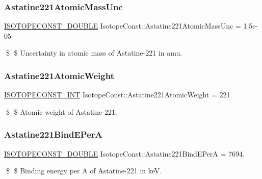 \subsubsection{\texorpdfstring{Astatine221\+Atomic\+Mass\+Unc}{Astatine221AtomicMassUnc}}
{\footnotesize\ttfamily \mbox{\hyperlink{group___isotope_const-_macros_ga8f45a7272ce02c0b4c65c44636ed719a}{I\+S\+O\+T\+O\+P\+E\+C\+O\+N\+S\+T\+\_\+\+D\+O\+U\+B\+LE}} Isotope\+Const\+::\+Astatine221\+Atomic\+Mass\+Unc = 1.\+5e-\/05}

\$ \$ Uncertainty in atomic mass of Astatine-\/221 in amu. \mbox{\label{group___isotope_const-_astatine-_at221_ga7865469d9987007f6b9b3aa79bedcbfa}} 
\subsubsection{\texorpdfstring{Astatine221\+Atomic\+Weight}{Astatine221AtomicWeight}}
{\footnotesize\ttfamily \mbox{\hyperlink{group___isotope_const-_macros_ga5f18360b3e99483a35c32d789e62621c}{I\+S\+O\+T\+O\+P\+E\+C\+O\+N\+S\+T\+\_\+\+I\+NT}} Isotope\+Const\+::\+Astatine221\+Atomic\+Weight = 221}

\$ \$ Atomic weight of Astatine-\/221. \mbox{\label{group___isotope_const-_astatine-_at221_ga42c8932a5d744331c6c93c31ceb1fb90}} 
\subsubsection{\texorpdfstring{Astatine221\+Bind\+E\+PerA}{Astatine221BindEPerA}}
{\footnotesize\ttfamily \mbox{\hyperlink{group___isotope_const-_macros_ga8f45a7272ce02c0b4c65c44636ed719a}{I\+S\+O\+T\+O\+P\+E\+C\+O\+N\+S\+T\+\_\+\+D\+O\+U\+B\+LE}} Isotope\+Const\+::\+Astatine221\+Bind\+E\+PerA = 7694.}

\$ \$ Binding energy per A of Astatine-\/221 in keV. \mbox{\label{group___isotope_const-_astatine-_at221_ga0fe83a156cdf17b1cef4a074e6a36bbb}} 
